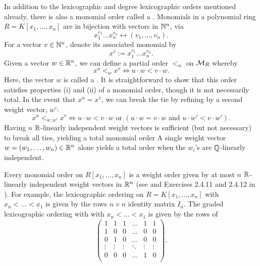 In addition to the lexicographic and degree lexicographic orders mentioned already,
there is also a monomial order called a .
Monomials in a polynomial ring $R = K[x_1, \ldots, x_n]$ are in bijection with vectors in $\bb N^n$, via
\[ x_1^{v_1} \dots x_n^{v_n} \longleftrightarrow (v_1, \ldots, v_n). \]
For a vector $v \in \bb N^n$, denote its associated monomial by 
\[ x^v := x_1^{v_1} \dots x_n^{v_n}. \]
Given a vector $w \in \bb R^n$, we can define a partial order $<_w$ on $\cal M_R$ whereby
\[ x^u <_w x^v \iff u \cdot w < v \cdot w. \]
Here, the vector $w$ is called a .
It is straightforward to show that this order satisfies properties (i) and (ii) of a monomial order, though it is not necessarily total.
In the event that $x^u = x^v$, we can break the tie by refining by a second weight vector, $w'$:
\[ x^u <_{w,w'} x^v \iff u \cdot w < v \cdot w \text{ or }(u \cdot w = v \cdot w \text{ and } u \cdot w' < v \cdot w'). \]
Having $n$ $\bb R$-linearly independent weight vectors is sufficient (but not necessary) to break all ties, yielding a total monomial order
A single weight vector $w = (w_1, \ldots, w_n) \in \bb R^n$ alone yields a total order when the $w_i$'s are $\bb Q$-linearly independent. 

Every monomial order on $R[x_1, \ldots, x_n]$ is a weight order given by at most $n$ $\bb R$-linearly independent weight vectors in $\bb R^n$
(see \cite{robbiano86} and Exercises 2.4.11 and 2.4.12 in \cite{cox07}).
For example, the lexicographic ordering on $R = K[x_1, \ldots, x_n]$ with $x_n < \dots < x_1$ is given by the rows $n \times n$ identity matrix $I_n$.
The graded lexicographic ordering with with $x_n < \dots < x_1$ is given by the rows of
  \[ \begin{pmatrix}
       1 & 1 & 1 & \dots & 1 & 1 \\
       1 & 0 & 0 & \dots & 0 & 0 \\
       0 & 1 & 0 & \dots & 0 & 0 \\
       \vdots & \vdots & \vdots & \ddots & \vdots & \vdots \\
       0 & 0 & 0 & \dots & 1 & 0 \\
     \end{pmatrix}. \]

